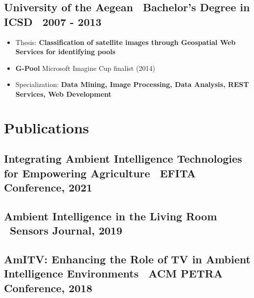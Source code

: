 \documentclass[a4paper,10pt]{article}
\begin{document}
\subsection*{ University of the Aegean \textbar\ Bachelor's Degree in ICSD \textbar\ 2007 - 2013}
\begin{adjustwidth}{1em}{1em}
    \begin{itemize}[left=0pt]
        \item Thesis: \textbf{Classification of satellite images through Geospatial Web Services for identifying pools}
        \item \textbf{G-Pool} Microsoft Imagine Cup finalist (2014)
        \item Specialization: \textbf{Data Mining, Image Processing, Data Analysis, REST Services, Web Development}
    \end{itemize}
\end{adjustwidth}


\vspace{2pt}


\section*{ Publications}
\subsection*{ Integrating Ambient Intelligence Technologies for Empowering Agriculture \textbar\ EFITA Conference, 2021}

\subsection*{ Ambient Intelligence in the Living Room \textbar\ Sensors Journal, 2019}

\subsection*{ AmITV: Enhancing the Role of TV in Ambient Intelligence Environments \textbar\ ACM PETRA Conference, 2018}

\vspace{2pt}
\end{document}
